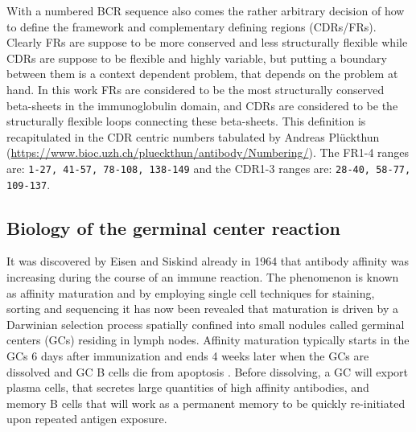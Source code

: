 With a numbered BCR sequence also comes the rather arbitrary decision of how to define the framework and complementary defining regions (CDRs/FRs).
Clearly FRs are suppose to be more conserved and less structurally flexible while CDRs are suppose to be flexible and highly variable, but putting a boundary between them is a context dependent problem, that depends on the problem at hand.
In this work FRs are considered to be the most structurally conserved beta-sheets in the immunoglobulin domain, and CDRs are considered to be the structurally flexible loops connecting these beta-sheets.
This definition is recapitulated in the CDR centric numbers tabulated by Andreas Pl{\"u}ckthun (\url{https://www.bioc.uzh.ch/plueckthun/antibody/Numbering/}).
The FR1-4 ranges are: \texttt{1-27, 41-57, 78-108, 138-149} and the CDR1-3 ranges are: \texttt{28-40, 58-77, 109-137}.






\subsection{Biology of the germinal center reaction}
It was discovered by Eisen and Siskind already in 1964 \cite{eisen1964variations} that antibody affinity was increasing during the course of an immune reaction.
The phenomenon is known as affinity maturation and by employing single cell techniques for staining, sorting and sequencing it has now been revealed that maturation is driven by a Darwinian selection process spatially confined into small nodules called germinal centers (GCs) residing in lymph nodes.
Affinity maturation typically starts in the GCs 6 days after immunization and ends 4 weeks later when the GCs are dissolved and GC B cells die from apoptosis \cite{victora2012germinal}.
Before dissolving, a GC will export plasma cells, that secretes large quantities of high affinity antibodies, and memory B cells that will work as a permanent memory to be quickly re-initiated upon repeated antigen exposure.

